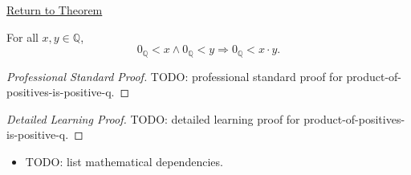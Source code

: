 \newpage
{}
\label{prf:product-of-positives-is-positive-q}

\begin{remark*}[Return]
\hyperref[prop:product-of-positives-is-positive-q]{Return to Theorem}
\end{remark*}

\begin{proposition*}
For all $x,y\in\mathbb{Q}$,
\[
0_{\mathbb{Q}}<x\land 0_{\mathbb{Q}}<y
\Longrightarrow
0_{\mathbb{Q}}<x\cdot y.
\]
\end{proposition*}

\begin{proof}[Professional Standard Proof]
\LRAProofBodyStart
TODO: professional standard proof for product-of-positives-is-positive-q.
\end{proof}

\begin{proof}[Detailed Learning Proof]
\LRAProofBodyStart
TODO: detailed learning proof for product-of-positives-is-positive-q.
\end{proof}

\begin{remark*}
\end{remark*}

\begin{dependencies}
\begin{itemize}
  \item TODO: list mathematical dependencies.
\end{itemize}
\end{dependencies}

\clearpage
